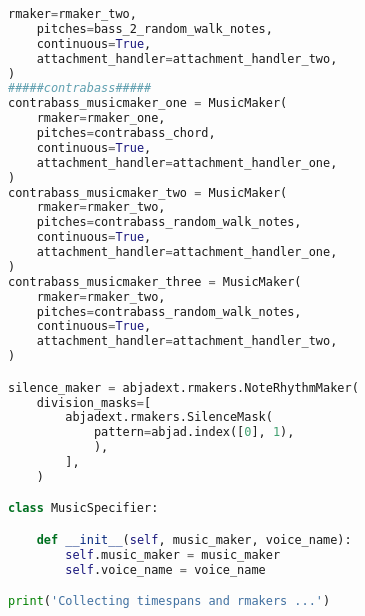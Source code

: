 \begin{lstlisting}[language=Python, caption=Invocation Source Code]
    rmaker=rmaker_two,
    pitches=bass_2_random_walk_notes,
    continuous=True,
    attachment_handler=attachment_handler_two,
)
#####contrabass#####
contrabass_musicmaker_one = MusicMaker(
    rmaker=rmaker_one,
    pitches=contrabass_chord,
    continuous=True,
    attachment_handler=attachment_handler_one,
)
contrabass_musicmaker_two = MusicMaker(
    rmaker=rmaker_two,
    pitches=contrabass_random_walk_notes,
    continuous=True,
    attachment_handler=attachment_handler_one,
)
contrabass_musicmaker_three = MusicMaker(
    rmaker=rmaker_two,
    pitches=contrabass_random_walk_notes,
    continuous=True,
    attachment_handler=attachment_handler_two,
)

silence_maker = abjadext.rmakers.NoteRhythmMaker(
    division_masks=[
        abjadext.rmakers.SilenceMask(
            pattern=abjad.index([0], 1),
            ),
        ],
    )

class MusicSpecifier:

    def __init__(self, music_maker, voice_name):
        self.music_maker = music_maker
        self.voice_name = voice_name

print('Collecting timespans and rmakers ...')


\end{lstlisting}
